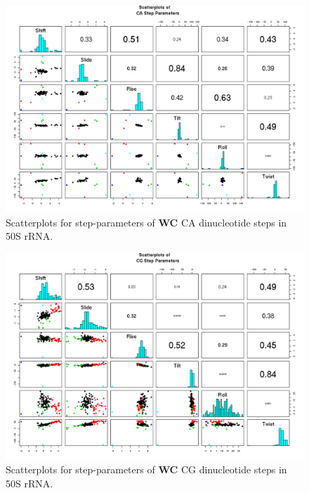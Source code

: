 \begin{figure}[H]
\centering
\includegraphics[angle=90, scale=0.6]{WC/CA.png}
\caption{Scatterplots for step-parameters of \textbf{WC} CA dinucleotide steps
in 50S rRNA.}
\label{fig:stepsCA}
\end{figure}

\begin{figure}[H]
\centering
\includegraphics[angle=90, scale=0.6]{WC/CG.png}
\caption{Scatterplots for step-parameters of \textbf{WC} CG dinucleotide steps
in 50S rRNA.}
\label{fig:stepsCG}
\end{figure}

